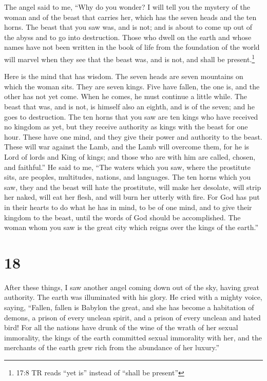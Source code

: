  The angel said to me, ``Why do you wonder? I will tell you
the mystery of the woman and of the beast that carries her, which has
the seven heads and the ten horns.  The beast that you saw
was, and is not; and is about to come up out of the abyss and to go into
destruction. Those who dwell on the earth and whose names have not been
written in the book of life from the foundation of the world will marvel
when they see that the beast was, and is not, and shall be
present.\footnote{17:8 TR reads ``yet is'' instead of ``shall be
  present''}

 Here is the mind that has wisdom. The seven heads are seven
mountains on which the woman sits.  They are seven kings.
Five have fallen, the one is, and the other has not yet come. When he
comes, he must continue a little while.  The beast that
was, and is not, is himself also an eighth, and is of the seven; and he
goes to destruction.  The ten horns that you saw are ten
kings who have received no kingdom as yet, but they receive authority as
kings with the beast for one hour.  These have one mind,
and they give their power and authority to the beast. 
These will war against the Lamb, and the Lamb will overcome them, for he
is Lord of lords and King of kings; and those who are with him are
called, chosen, and faithful.''  He said to me, ``The
waters which you saw, where the prostitute sits, are peoples,
multitudes, nations, and languages.  The ten horns which
you saw, they and the beast will hate the prostitute, will make her
desolate, will strip her naked, will eat her flesh, and will burn her
utterly with fire.  For God has put in their hearts to do
what he has in mind, to be of one mind, and to give their kingdom to the
beast, until the words of God should be accomplished.  The
woman whom you saw is the great city which reigns over the kings of the
earth.''

\hypertarget{section-17}{%
\section{18}\label{section-17}}

 After these things, I saw another angel coming down out of
the sky, having great authority. The earth was illuminated with his
glory.  He cried with a mighty voice, saying, ``Fallen,
fallen is Babylon the great, and she has become a habitation of demons,
a prison of every unclean spirit, and a prison of every unclean and
hated bird!  For all the nations have drunk of the wine of
the wrath of her sexual immorality, the kings of the earth committed
sexual immorality with her, and the merchants of the earth grew rich
from the abundance of her luxury.''

